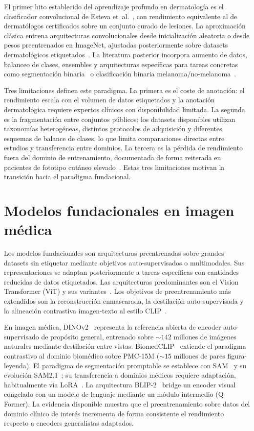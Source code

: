 El primer hito establecido del aprendizaje profundo en dermatología
es el clasificador convolucional de Esteva et~al.~\cite{esteva2017},
con rendimiento equivalente al de dermatólogos certificados sobre
un conjunto curado de lesiones. La aproximación clásica entrena
arquitecturas convolucionales desde inicialización aleatoria o desde
pesos preentrenados en ImageNet, ajustadas posteriormente sobre
datasets dermatológicos etiquetados~\cite{tschandl2018,ham10000}. La
literatura posterior incorpora aumento de datos, balanceo de clases,
ensembles y arquitecturas específicas para tareas concretas como
segmentación binaria~\cite{isic2018} o clasificación binaria
melanoma/no-melanoma~\cite{kawahara2019}.

Tres limitaciones definen este paradigma. La primera es el coste de
anotación: el rendimiento escala con el volumen de datos etiquetados
y la anotación dermatológica requiere expertos clínicos con
disponibilidad limitada. La segunda es la fragmentación entre
conjuntos públicos: los datasets disponibles utilizan taxonomías
heterogéneas, distintos protocolos de adquisición y diferentes
esquemas de balance de clases, lo que limita comparaciones directas
entre estudios y transferencia entre dominios. La tercera es la
pérdida de rendimiento fuera del dominio de entrenamiento,
documentada de forma reiterada en pacientes de fototipo cutáneo
elevado~\cite{fitzpatrick17k,ddi}. Estas tres limitaciones motivan
la transición hacia el paradigma fundacional.

\section{Modelos fundacionales en imagen médica}
\label{sec:fundacionales-medica}

Los modelos fundacionales son arquitecturas preentrenadas sobre
grandes datasets sin etiquetar mediante objetivos auto-supervisados o
multimodales. Sus representaciones se adaptan posteriormente a
tareas específicas con cantidades reducidas de datos etiquetados.
Las arquitecturas predominantes son el Vision Transformer (ViT) y
sus variantes~\cite{vit2021}. Los objetivos de preentrenamiento más
extendidos son la reconstrucción enmascarada, la destilación
auto-supervisada y la alineación contrastiva imagen-texto al estilo
CLIP~\cite{clip2021,siglip2023}.

En imagen médica, DINOv2~\cite{dinov2} representa la referencia
abierta de encoder auto-supervisado de propósito general, entrenado
sobre $\sim 142$ millones de imágenes naturales mediante
destilación entre vistas. BiomedCLIP~\cite{biomedclip} extiende el
paradigma contrastivo al dominio biomédico sobre PMC-15M
($\sim 15$ millones de pares figura-leyenda). El paradigma de
segmentación promptable se establece con SAM~\cite{sam2023} y su
evolución SAM2.1~\cite{sam2}; su transferencia a dominios médicos
requiere adaptación, habitualmente vía LoRA~\cite{lora}. La
arquitectura BLIP-2~\cite{blip2_2023} bridge un encoder visual
congelado con un modelo de lenguaje mediante un módulo
intermedio (Q-Former). La evidencia disponible muestra que el
preentrenamiento sobre datos del dominio clínico de interés
incrementa de forma consistente el rendimiento respecto a encoders
generalistas adaptados.

